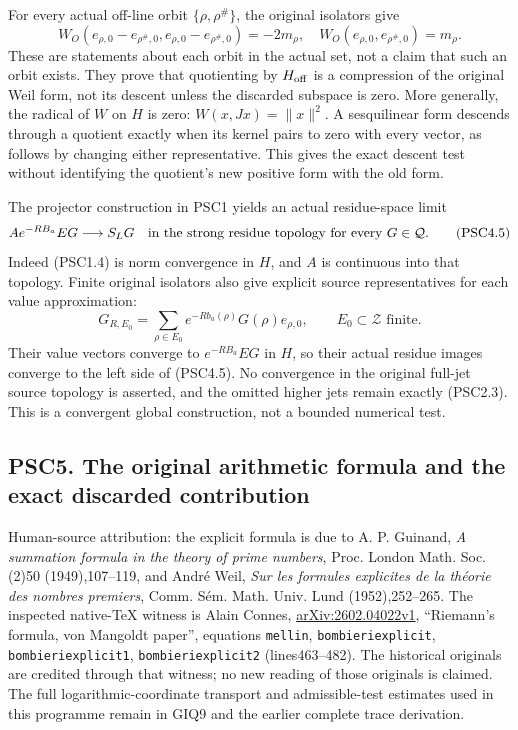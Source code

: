 For every actual off-line orbit \(\{\rho,\rho^\#\}\), the original
isolators give \[
W_O(e_{\rho,0}-e_{\rho^\#,0},e_{\rho,0}-e_{\rho^\#,0})=-2m_\rho,
\quad
W_O(e_{\rho,0},e_{\rho^\#,0})=m_\rho.
\tag{PSC4.4}
\] These are statements about each orbit in the actual set, not a claim
that such an orbit exists. They prove that quotienting by
\(H_{\rm off}\) is a compression of the original Weil form, not its
descent unless the discarded subspace is zero. More generally, the
radical of \(W\) on \(H\) is zero: \(W(x,Jx)=\|x\|^2\). A sesquilinear
form descends through a quotient exactly when its kernel pairs to zero
with every vector, as follows by changing either representative. This
gives the exact descent test without identifying the quotient's new
positive form with the old form.

The projector construction in PSC1 yields an actual residue-space limit
\[
A e^{-RB_a}EG\longrightarrow S_LG
\quad\hbox{in the strong residue topology for every }G\in\mathcal Q.
\tag{PSC4.5}
\] Indeed (PSC1.4) is norm convergence in \(H\), and \(A\) is continuous
into that topology. Finite original isolators also give explicit source
representatives for each value approximation: \[
G_{R,E_0}=\sum_{\rho\in E_0}e^{-Rb_a(\rho)}G(\rho)e_{\rho,0},
\qquad E_0\subset\mathscr Z\text{ finite}.
\tag{PSC4.6}
\] Their value vectors converge to \(e^{-RB_a}EG\) in \(H\), so their
actual residue images converge to the left side of (PSC4.5). No
convergence in the original full-jet source topology is asserted, and
the omitted higher jets remain exactly (PSC2.3). This is a convergent
global construction, not a bounded numerical test.

\subsection{PSC5. The original arithmetic formula and the exact
discarded
contribution}\label{psc5.-the-original-arithmetic-formula-and-the-exact-discarded-contribution}

Human-source attribution: the explicit formula is due to A. P. Guinand,
\emph{A summation formula in the theory of prime numbers}, Proc. London
Math. Soc. (2)50 (1949),107--119, and André Weil, \emph{Sur les formules
explicites de la théorie des nombres premiers}, Comm. Sém. Math. Univ.
Lund (1952),252--265. The inspected native-TeX witness is Alain Connes,
\href{https://arxiv.org/abs/2602.04022v1}{arXiv:2602.04022v1},
``Riemann's formula, von Mangoldt paper'', equations \texttt{mellin},
\texttt{bombieriexplicit}, \texttt{bombieriexplicit1},
\texttt{bombieriexplicit2} (lines463--482). The historical originals are
credited through that witness; no new reading of those originals is
claimed. The full logarithmic-coordinate transport and admissible-test
estimates used in this programme remain in GIQ9 and the earlier complete
trace derivation.

